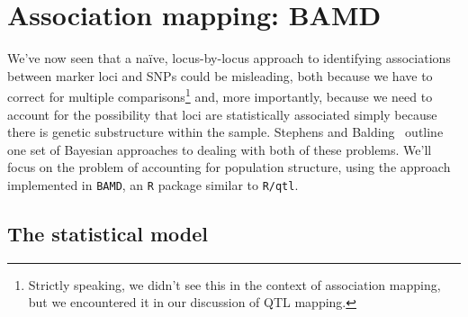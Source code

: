 \chapter{Association mapping: BAMD}

We've now seen that a na{\"i}ve, locus-by-locus approach to
identifying associations between marker loci and SNPs could be
misleading, both because we have to correct for multiple
comparisons\footnote{Strictly speaking, we didn't see this in the
  context of association mapping, but we encountered it in our
  discussion of QTL mapping.} and, more importantly, because we need
to account for the possibility that loci are statistically associated
simply because there is genetic substructure within the
sample. Stephens and Balding~\cite{Stephens-Balding-2009} outline one
set of Bayesian approaches to dealing with both of these
problems. We'll focus on the problem of accounting for population
structure, using the approach implemented in {\tt BAMD}, an {\tt R}
package similar to {\tt R/qtl}.

\section*{The statistical model}

